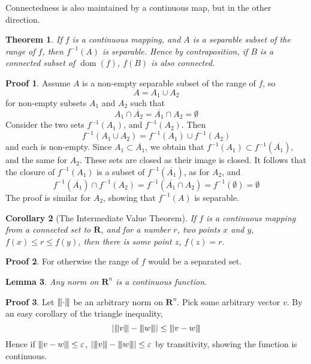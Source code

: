 \documentclass[12pt]{amsbook}
\theoremstyle{plain}
\newtheorem{theorem}{Theorem}
\newtheorem{lemma}[theorem]{Lemma}
\newtheorem{corollary}[theorem]{Corollary}
\theoremstyle{definition}
\newtheorem*{prf}{Proof}
\DeclareMathOperator{\dom}{dom}
\newcommand{\tripnorm}[1]{{\left\vert\kern-0.25ex\left\vert\kern-0.25ex\left\vert #1 
    \right\vert\kern-0.25ex\right\vert\kern-0.25ex\right\vert}}
\begin{document}
Connectedness is also maintained by a continuous map, but in the other direction.

\begin{theorem}
  If $f$ is a continuous mapping, and $A$ is a separable subset of the range of $f$, then $f^{-1}(A)$ is separable. Hence by contraposition, if $B$ is a connected subset of $\dom(f)$, $f(B)$ is also connected.
\end{theorem}
\begin{prf}
  Assume $A$ is a non-empty separable subset of the range of $f$, so
  \[ A = A_1 \cup A_2 \]
  for non-empty subsets $A_1$ and $A_2$ such that
  \[ A_1 \cap \overline{A_2} = \overline{A_1} \cap A_2 = \emptyset \]
  Consider the two sets $f^{-1}(A_1)$, and $f^{-1}(A_2)$. Then
  \[ f^{-1}(A_1 \cup A_2) = f^{-1}(A_1) \cup f^{-1}(A_2) \]
  and each is non-empty. Since $A_1 \subset \overline{A_1}$, we obtain that $f^{-1}(A_1) \subset f^{-1}(\overline{A_1})$, and the same for $A_2$. These sets are closed as their image is closed. It follows that the closure of $f^{-1}(A_1)$ is a subset of $f^{-1}(\overline{A_1})$, as for $A_2$, and
  \[ f^{-1}(\overline{A_1}) \cap f^{-1}(A_2) = f^{-1}(\overline{A_1} \cap A_2) = f^{-1}(\emptyset) = \emptyset \]
  The proof is similar for $A_2$, showing that $f^{-1}(A)$ is separable.
\end{prf}

\begin{corollary}[The Intermediate Value Theorem]
  If $f$ is a continuous mapping from a connected set to $\mathbf{R}$, and for a number $r$, two points $x$ and $y$, $f(x) \leq r \leq f(y)$, then there is some point $z$, $f(z) = r$.
\end{corollary}
\begin{prf}
  For otherwise the range of $f$ would be a separated set.
\end{prf}

\begin{lemma}Any norm on $\mathbf{R}^n$ is a continuous function.\end{lemma}
\begin{prf}
  Let $\tripnorm{\cdot}$ be an arbitrary norm on $\mathbf{R}^n$. Pick some arbitrary vector $v$. By an easy corollary of the triangle inequality,
  \[ |\tripnorm{v} - \tripnorm{w}| \leq \tripnorm{v - w} \]
  Hence if $\tripnorm{v - w} \leq \varepsilon$, $|\tripnorm{v} - \tripnorm{w}| \leq \varepsilon$ by transitivity, showing the function is continuous.
\end{prf}
\end{document}
